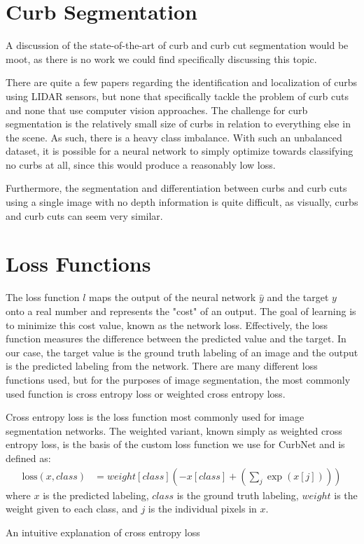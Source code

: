 \section{Curb Segmentation}\label{section:background-curbsegmentation}
A discussion of the state-of-the-art of curb and curb cut segmentation would be moot, as there is no work we could find specifically discussing this topic.

There are quite a few papers regarding the identification and localization of curbs using LIDAR sensors, but none that specifically tackle the problem of curb cuts and none that use computer vision approaches.
The challenge for curb segmentation is the relatively small size of curbs in relation to everything else in the scene.
As such, there is a heavy class imbalance.
With such an unbalanced dataset, it is possible for a neural network to simply optimize towards classifying no curbs at all, since this would produce a reasonably low loss.

Furthermore, the segmentation and differentiation between curbs and curb cuts using a single image with no depth information is quite difficult, as visually, curbs and curb cuts can seem very similar.

\section{Loss Functions}\label{section:background-loss}
The loss function $l$ maps the output of the neural network $\hat{y}$ and the target $y$ onto a real number and represents the "cost" of an output.
The goal of learning is to minimize this cost value, known as the network loss.
Effectively, the loss function measures the difference between the predicted value and the target.
In our case, the target value is the ground truth labeling of an image and the output is the predicted labeling from the network.
There are many different loss functions used, but for the purposes of image segmentation, the most commonly used function is cross entropy loss or weighted cross entropy loss.

Cross entropy loss is the loss function most commonly used for image segmentation networks. The weighted variant, known simply as weighted cross entropy loss, is the basis of the custom loss function we use for CurbNet and is defined as:
\begin{align}
	\text{loss}(x, class) &= weight[class]\left(-x[class] + \left(\sum_{j}\exp(x[j])\right)\right)
\end{align}
where $x$ is the predicted labeling, $class$ is the ground truth labeling, $weight$ is the weight given to each class, and $j$ is the individual pixels in $x$.

An intuitive explanation of cross entropy loss